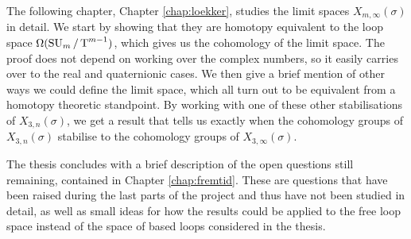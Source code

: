 The following chapter, Chapter \ref{chap:loekker}, studies the limit
spaces $X_{m,\infty}(\sigma)$ in detail. We start by showing that they
are homotopy equivalent to the loop space $\Omega(\operatorname{SU}_{m}/\operatorname{T}^{m-1})$, which
gives us the cohomology of the limit space. The proof does not depend
on working over the complex numbers, so it easily carries over to the
real and quaternionic cases. We then give a brief
mention of other ways we could define the limit space, which all turn
out to be equivalent from a homotopy theoretic standpoint. By working
with one of these other stabilisations of $X_{3,n}(\sigma)$, we get a
result that tells us exactly when the cohomology groups of
$X_{3,n}(\sigma)$ stabilise to the cohomology groups of
$X_{3,\infty}(\sigma)$.

The thesis concludes with a brief description of the open questions
still remaining, contained in Chapter \ref{chap:fremtid}. These are
questions that have been raised during the last parts of the project
and thus have not been studied in detail, as well as small ideas for
how the results could be applied to the free loop space instead of
the space of based loops considered in the thesis.








